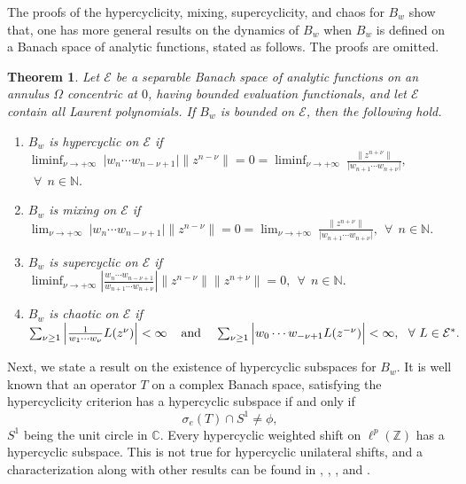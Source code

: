 \documentclass[12pt, reqno]{amsart}
\newtheorem{theorem}{Theorem}[section]
\theoremstyle{definition}
\theoremstyle{remark}
\numberwithin{equation}{section}
\begin{document}
The proofs of the hypercyclicity, mixing, supercyclicity, and chaos for $B_w$ show that, one has more general results on the dynamics of $B_w$ when $B_w$ is defined on a Banach space of analytic functions, stated as follows. The proofs are omitted.

\begin{theorem}\label{gen1}
    Let $\mathcal{E}$ be a separable Banach space of analytic functions on an annulus $\Omega$ concentric at $0$, having bounded evaluation functionals, and let $\mathcal{E}$ contain all Laurent polynomials. If $B_w$ is bounded on $\mathcal{E}$, then the following hold.
    \begin{enumerate}
         \item[(i)] $B_{w}$ is hypercyclic on $\mathcal{E}$ if\\  
         $\liminf_{\nu\rightarrow +\infty}~ \lvert w_{n}\cdots w_{n-\nu+1}\rvert\lVert z^{n-\nu}\rVert=0=\liminf_{\nu\rightarrow +\infty}~  \frac{\lVert z^{n+\nu }\rVert}{\lvert w_{n+1}\cdots w_{n+\nu}\rvert},$ $~~ \forall~~ n\in \mathbb{N}.$
        \item[(ii)] $B_w$ is mixing on $\mathcal{E}$ if\\
         $\lim_{\nu\rightarrow +\infty}~ \lvert w_{n}\cdots w_{n-\nu+1}\rvert\lVert z^{n-\nu}\rVert =0= \lim_{\nu\rightarrow +\infty}~   \frac{\lVert z^{n+\nu }\rVert}{\lvert w_{n+1}\cdots w_{n+\nu}\rvert},~~ \forall~~ n\in \mathbb{N}.$
         \item[(iii)] $B_{w}$ is  supercyclic on $\mathcal{E}$ if\\  
         $
         \liminf_{\nu\rightarrow +\infty} \left|\frac{w_{n}\cdots w_{n-\nu+1} }{w_{n+1}\cdots w_{n+\nu}}\right|\|z^{n-\nu}\|\|z^{n+\nu}\|=0,~~ \forall~~ n\in \mathbb{N}.
         $
         \item[(iv)]  $B_w$ is chaotic on $\mathcal{E}$ if\\
         $\sum_{\nu\geq 1} \Big|\frac{1}{w_{1}\cdots w_{\nu}} L(z^{\nu})\Big|<\infty
       \hskip .4cm \text{and}\hskip .4cm  \sum_{\nu\geq 1} \Big |w_{0}\cdots w_{-\nu+1} L(z^{-\nu})\Big |<\infty,~~\forall~ L\in \mathcal{E^{*}}.
         $
     \end{enumerate}
\end{theorem}


Next, we state a result on the existence of hypercyclic subspaces for $B_w$. It is well known that an operator $T$ on a complex Banach space, satisfying the hypercyclicity criterion has a hypercyclic subspace if and only if 
\[
\sigma_e(T)\cap S^1\neq \phi,
\]
$S^1$ being the unit circle in $\mathbb{C}$. Every hypercyclic weighted shift on $\ell^p(\mathbb{Z})$ has a hypercyclic subspace. This is not true for hypercyclic unilateral shifts, and a characterization along with other results can be found in \cite{Bayart-Matheron}, \cite{Leon}, \cite{Menet}, and \cite{Montes}.
\end{document}
